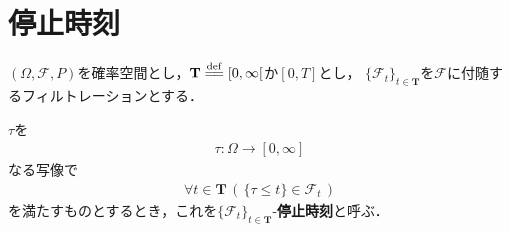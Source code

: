\section{停止時刻}
	$(\Omega,\mathscr{F},P)$を確率空間とし，$\mathbf{T} \defeq [0,\infty[$か$[0,T]$とし，
	$\{\mathscr{F}_t\}_{t \in \mathbf{T}}$を$\mathscr{F}$に付随するフィルトレーションとする．
	
	$\tau$を
	\begin{align}
		\tau:\Omega \longrightarrow [0,\infty]
	\end{align}
	なる写像で
	\begin{align}
		\forall t \in \mathbf{T}\, \left(\, \{\tau \leq t\} \in \mathscr{F}_t\, \right)
	\end{align}
	を満たすものとするとき，これを$\{\mathscr{F}_t\}_{t \in \mathbf{T}}$-{\bf 停止時刻}と呼ぶ．
	
	\begin{screen}
		\begin{thm}[離散時間の任意抽出定理]
			
		\end{thm}
	\end{screen}